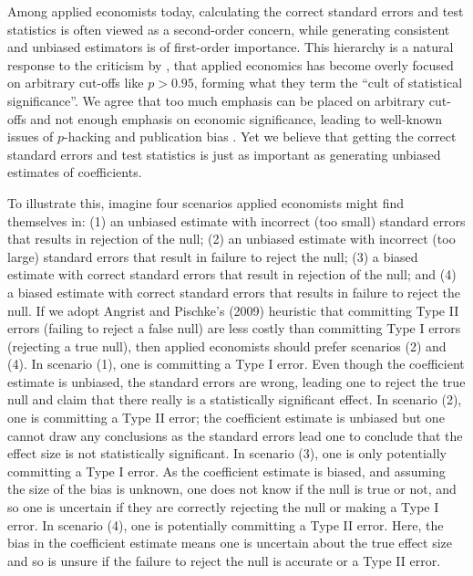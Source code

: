 \documentclass[11pt]{article}
\begin{document}
Among applied economists today, calculating the correct standard errors and test statistics is often viewed as a second-order concern, while generating consistent and unbiased estimators is of first-order importance. This hierarchy is a natural response to the criticism by \cite{ziliak_cult_2008}, that applied economics has become overly focused on arbitrary cut-offs like $p > 0.95$, forming what they term the ``cult of statistical significance''. We agree that too much emphasis can be placed on arbitrary cut-offs and not enough emphasis on economic significance, leading to well-known issues of $p$-hacking and publication bias \citep{brodeur_methods_2020}. Yet we believe that getting the correct standard errors and test statistics is just as important as generating unbiased estimates of coefficients.

To illustrate this, imagine four scenarios applied economists might find themselves in: (1) an unbiased estimate with incorrect (too small) standard errors that results in rejection of the null; (2) an unbiased estimate with incorrect (too large) standard errors that result in failure to reject the null; (3) a biased estimate with correct standard errors that result in rejection of the null; and (4) a biased estimate with correct standard errors that results in failure to reject the null. If we adopt Angrist and Pischke's (2009) heuristic that committing Type II errors (failing to reject a false null) are less costly than committing Type I errors (rejecting a true null), then applied economists should prefer scenarios (2) and (4). In scenario (1), one is committing a Type I error. Even though the coefficient estimate is unbiased, the standard errors are wrong, leading one to reject the true null and claim that there really is a statistically significant effect. In scenario (2), one is committing a Type II error; the coefficient estimate is unbiased but one cannot draw any conclusions as the standard errors lead one to conclude that the effect size is not statistically significant. In scenario (3), one is only potentially committing a Type I error. As the coefficient estimate is biased, and assuming the size of the bias is unknown, one does not know if the null is true or not, and so one is uncertain if they are correctly rejecting the null or making a Type I error. In scenario (4), one is potentially committing a Type II error. Here, the bias in the coefficient estimate means one is uncertain about the true effect size and so is unsure if the failure to reject the null is accurate or a Type II error.
\end{document}
